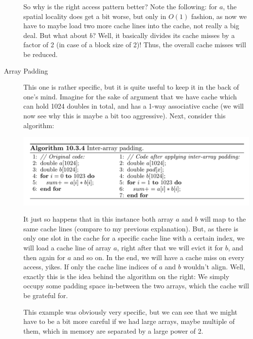 \documentclass[../../main.tex]{subfiles}
\begin{document}
\begin{description}
    So why is the right access pattern better? Note the following: for $a$, the spatial locality does get a bit worse, but only in $O(1)$ fashion, as now we have to maybe load two more cache lines into the cache, not really a big deal. But what about $b$? Well, it basically divides its cache misses by a factor of 2 (in case of a block size of 2)! Thus, the overall cache misses will be reduced.

    \item[Array Padding] This one is rather specific, but it is quite useful to keep it in the back of one's mind. Imagine for the sake of argument that we have cache which can hold 1024 doubles in total, and has a 1-way associative cache (we will now see why this is maybe a bit too aggressive). Next, consider this algorithm:
    
    \includegraphics[width=\linewidth]{Chapters/09/array_padding.png}
    
    It just so happens that in this instance both array $a$ and $b$ will map to the same cache lines (compare to my previous explanation). But, as there is only one slot in the cache for a specific cache line with a certain index, we will load a cache line of array $a$, right after that we will evict it for $b$, and then again for $a$ and so on. In the end, we will have a cache miss on every access, yikes. If only the cache line indices of $a$ and $b$ wouldn't align. Well, exactly this is the idea behind the algorithm on the right: We simply occupy some padding space in-between the two arrays, which the cache will be grateful for.

    This example was obviously very specific, but we can see that we might have to be a bit more careful if we had large arrays, maybe multiple of them, which in memory are separated by a large power of 2.
\end{description}
\end{document}
